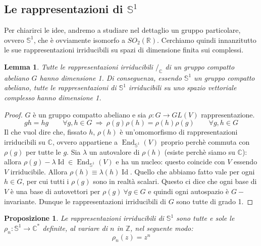 \documentclass[11pt]{article}
\theoremstyle{plain}
\newtheorem{lemma}[thm]{Lemma}
\newtheorem{prop}[thm]{Proposizione}
\theoremstyle{definition}
\theoremstyle{remark}
\newcommand{\C}{\mathbb{C}}
\newcommand{\R}{\mathbb{R}}
\newcommand{\Z}{\mathbb{Z}}
\DeclareMathOperator{\End}{End}
\DeclareMathOperator{\Id}{Id}
\begin{document}
\subsection{Le rappresentazioni di $\mathbb{S}^1$}
Per chiarirci le idee, andremo a studiare nel dettaglio un gruppo particolare, ovvero $\mathbb{S}^1$, che è ovviamente isomorfo a $SO_2(\R)$. Cerchiamo quindi innanzitutto le sue rappresentazioni irriducibili su spazi di dimensione finita sui complessi.

\begin{lemma}
Tutte le rappresentazioni irriducibili $/_\C$ di un gruppo compatto abeliano $G$ hanno dimensione 1. Di conseguenza, essendo $\mathbb{S}^1$ un gruppo compatto abeliano, tutte le rappresentazioni di $\mathbb{S}^1$ irriducibili su uno spazio vettoriale complesso hanno dimensione 1.
\end{lemma}
\begin{proof}
  $G$ è un gruppo compatto abeliano e sia $\rho:G\rightarrow GL(V)$ rappresentazione.
  \[ gh = hg \qquad \forall g,h \in G \ \Rightarrow\ \rho(g)\rho(h) = \rho(h)\rho(g) \qquad \forall g, h \in G\]
  Il che vuol dire che, fissato $h$, $\rho(h)$ è un'omomorfismo di rappresentazioni irriducibili su $\C$, ovvero appartiene a $\End_{\mathbb{S}^1}(V)$ proprio perchè commuta con $\rho(g)$ per tutte le $g$. Sia $\lambda$ un autovalore di $\rho(h)$ (esiste perchè siamo su $\C$): allora $\rho(g)-\lambda \Id\in \End_{\mathbb{S}^1}(V)$ e ha un nucleo: questo coincide con $V$ essendo $V$ irriducibile. Allora $\rho(h) \equiv \lambda(h) \Id$. Quello che abbiamo fatto vale per ogni $h \in G$, per cui tutti i $\rho(g) $ sono in realtà scalari. Questo ci dice che ogni base di $V$ è una base di autovettori per $\rho(g)\ \forall g\in G$ e quindi ogni autospazio è $G-$invariante. Dunque le rappresentazioni irriducibili di $G$ sono tutte di grado 1.
\end{proof}


\begin{prop}
  Le rappresentazioni irriducibili di $\mathbb{S}^1$ sono tutte e sole le $\rho_n:\mathbb{S}^1\to\C^*$ definite, al variare di $n$ in $\Z$, nel seguente modo:
  \[ \rho_n(z) = z^n \]
\end{prop}
\end{document}
